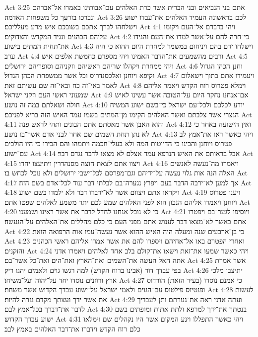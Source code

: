 Act 3:25  אתם בני הנביאים ובני הברית אשר כרת האלהים עם־אבותינו באמרו אל־אברהם ונברכו בזרעך כל משפחות האדמה׃
Act 3:26  לכם בראשונה העמיד האלהים את־עבדו ישוע וישלחהו לברך אתכם בשובכם איש מרע מעלליכם׃
Act 4:1  ויהי בדברם אל־העם ויקומו עליהם הכהנים ונגיד המקדש והצדוקים׃
Act 4:2  כי־חרה להם על־אשר למדו את־העם והגידו את־תחית המתים בישוע׃
Act 4:3  וישלחו ידם בהם ויניחום במשמר למחרת היום ההוא כי היה ערב׃
Act 4:4  ורבים מהשמעים את־הדבר האמינו ויהי מספרם כחמשת אלפים איש׃
Act 4:5  ויהי ממחרת ויקהלו שריהם ראשיהם וזקניהם וסופריהם ירושלים׃
Act 4:6  וחנן הכהן הגדול וקיפא ויוחנן ואלכסנדרוס וכל אשר ממשפחת הכהן הגדול׃
Act 4:7  ויעמידו אתם בתוך וישאלום לאמר באי־זה כח ובאי־זה שם עשיתם זאת׃
Act 4:8  וימלא פטרוס רוח הקדש ויאמר אליהם שמעוני ראשי העם וזקני ישראל׃
Act 4:9  אם־אנחנו נחקר היום על־הטובה אשר עשינו לאיש חולה ושאלתם במה זה נושע׃
Act 4:10  יודע לכלכם ולכל־עם ישראל כי־בשם ישוע המשיח הנצרי אשר צלבתם ואשר האלהים הקימו מן־המתים בשמו עמד האיש הזה בריא לפניכם׃
Act 4:11  והוא האבן אשר מאסתם אתם הבונים ותהי לראש פנה׃
Act 4:12  ואין הישועה באחר כי לא נתן תחת השמים שם אחר לבני אדם אשר־בו נושע׃
Act 4:13  ויהי כאשר ראו את־אמץ לב פטרוס ויוחנן והבינו כי הדיוטות המה ולא בעלי־חכמה ויתמהו והם הכירו כי היו הולכים עם־ישוע׃
Act 4:14  אבל בראותם את האיש הנרפא עמד אצלם לא מצאו לדבר נגדם דבר׃
Act 4:15  ויצוו אתם לצאת חוצה מסנהדרין ויתיעצו יחדו׃
Act 4:16  ויאמרו מה־נעשה לאנשים האלה הנה אות גלוי נעשה על־ידיהם וגם־מפרסם לכל־ישבי ירושלים ולא נוכל לכחש בו׃
Act 4:17  אך למען לא־ירבה הדבר בעם ויפרץ נגערה־בם לבלתי דבר עוד לכל־אדם בשם הזה׃
Act 4:18  ויקראו אתם ויצוום אשר לא־ידברו דבר ולא ילמדו בשם ישוע׃
Act 4:19  ויענו פטרוס ויוחנן ויאמרו אליהם הנכון הוא לפני האלהים שמע לכם יתר משמע לאלהים שפטו אתם׃
Act 4:20  כי לא נוכל אנחנו לחדל לדבר את אשר ראינו ושמענו׃
Act 4:21  ויוסיפו לגער־בם ויפטרו אתם באשר לא־מצאו דבר לענוש אתם מפני העם כי כלם מהללים את־האלהים על־הנעשה׃
Act 4:22  כי בן־ארבעים שנה ומעלה היה האיש ההוא אשר נעשה־עמו אות הרפואה הזאת׃
Act 4:23  ואחרי הפטרם באו אל־אחיהם ויספרו להם את אשר אמרו אליהם ראשי הכהנים והזקנים׃
Act 4:24  ויהי כאשר שמעו את־זאת וישאו את־קולם בלב אחד לאלהים ויאמרו אדני אתה האל העשה את־השמים ואת־הארץ ואת־הים ואת־כל אשר־בם׃
Act 4:25  אשר אמרת בפי עבדך דוד (אבינו ברוח הקדש) למה רגשו גוים ולאמים יהגו ריק׃
Act 4:26  יתיצבו מלכי ארץ ורוזנים נוסדו יחד על־יהוה ועל־משיחו׃
Act 4:27  כי אמנם נוסדו (בעיר הזאת) הורדוס ופנטיוס פילטוס עם־הגוים ולאמי ישראל על־ישוע עבדך הקדוש אשר משחת׃
Act 4:28  לעשות את אשר ידך ועצתך מקדם גזרה להיות׃
Act 4:29  ועתה אדני ראה את־גערתם ותן לעבדיך לדבר את־דברך בכל־אמץ לבם׃
Act 4:30  בנטתך את־ידך למרפא ולתת אתות ומופתים בשם ישוע עבדך הקדוש׃
Act 4:31  ויהי כאשר התפללו וינע המקום אשר היו נקהלים שם וימלאו כלם רוח הקדש וידברו את־דבר האלהים באמץ לבב׃
